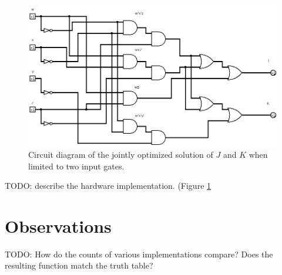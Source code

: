 \documentclass[12pt]{article}
\begin{document}
\begin{figure}[!htb]
\center
\includegraphics[scale=0.5]{JKjoint-01}
\caption{Circuit diagram of the jointly optimized solution of $J$ and $K$ when limited to two input gates.}
\label{fig:JKjointcircuit}
\end{figure}

TODO: describe the hardware implementation.
(Figure \ref{fig:JKjointcircuit}

\clearpage

\section{Observations}

TODO: How do the counts of various implementations compare?
Does the resulting function match the truth table?
\end{document}
